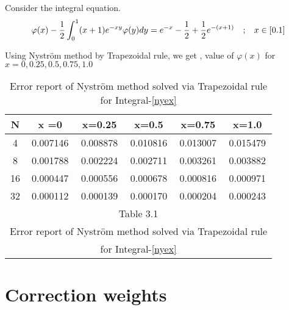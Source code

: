 \documentclass[../document.tex]{subfiles}
\begin{document}
	\begin{examp}


	Consider the integral equation.
	\begin{equation} \label{nyex}
	\varphi(x) -
	\frac{1}{2} \int_0^1 (x+1)e^{-xy} \varphi(y) dy =
	e^{-x} -\frac{1}{2} + \frac{1}{2} e^{-(x+1)}
	\quad \textsc{;} \quad x\in [0.1]
\end{equation}
	
	Using Nyström method by Trapezoidal rule, we get ,
	value of $\varphi(x)$ for $x = 0 , 0.25 , 0.5 ,0.75 ,1.0$
	\begin{table}[h]
		\centering
		\begin{tabular}{| c || c || c || c || c || c |}
			\hline
			N & x =0 & x=0.25 & x=0.5 & x=0.75 & x=1.0\\
			\hline \hline
			4 & 0.007146 & 0.008878 & 0.010816 & 0.013007 & 0.015479 \\
			8 & 0.001788 & 0.002224 & 0.002711 & 0.003261 & 0.003882 \\
			16 & 0.000447 & 0.000556 & 0.000678 & 0.000816 & 0.000971 \\
			32 & 0.000112 & 0.000139 & 0.000170 & 0.000204 & 0.000243 \\
			\hline
			\multicolumn{6}{|c|}{		Table 3.1                 }\\
			\multicolumn{6}{|c|}{Error report  of Nyström method  solved via    Trapezoidal rule} \\
			\multicolumn{6}{|c|}{ for Integral-\eqref{nyex}} \\			
			\hline	
		\end{tabular}
		\caption{ Error report  of Nyström method  solved via   Trapezoidal rule for Integral-\eqref{nyex}}
	\end{table}
		
	\end{examp}
	
	\section{Correction weights}
	
\end{document}
